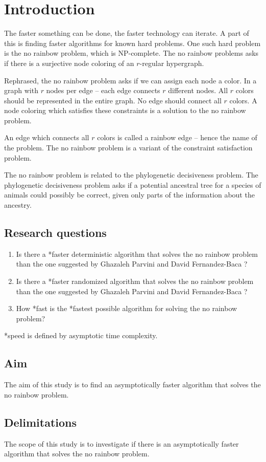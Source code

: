 \chapter{Introduction}
The faster something can be done, the faster technology can iterate.
A part of this is finding faster algorithms for known hard problems.
One such hard problem is the no rainbow problem, which is NP-complete.
The no rainbow problems asks if there is a surjective node coloring of an $r$-regular hypergraph.
\cite{sourceNoRainbow}

Rephrased, the no rainbow problem asks if we can assign each node a color.
In a graph with $r$ nodes per edge -- each edge connects $r$ different nodes.
All $r$ colors should be represented in the entire graph.
No edge should connect all $r$ colors.
A node coloring which satisfies these constraints is a solution to the no rainbow problem.

An edge which connects all $r$ colors is called a rainbow edge -- hence the name of the problem.
The no rainbow problem is a variant of the constraint satisfaction problem.

The no rainbow problem is related to the phylogenetic decisiveness problem. The phylogenetic decisiveness problem asks if a potential ancestral tree for a species of animals could possibly be correct, given only parts of the information about the ancestry. \cite{sourcePhylogeneticDecisiveness}

\section{Research questions}
\begin{enumerate}
  \item Is there a *faster deterministic algorithm that solves the no rainbow problem than the one suggested by Ghazaleh Parvini and David Fernandez-Baca \cite{sourceNoRainbow}?
  \item Is there a *faster randomized algorithm that solves the no rainbow problem than the one suggested by Ghazaleh Parvini and David Fernandez-Baca \cite{sourceNoRainbow}?
  \item How *fast is the *fastest possible algorithm for solving the no rainbow problem? 
\end{enumerate}
*speed is defined by asymptotic time complexity.

\section{Aim}
The aim of this study is to find an asymptotically faster algorithm that solves
the no rainbow problem.

\section{Delimitations}
The scope of this study is to investigate if there is an asymptotically faster
algorithm that solves the no rainbow problem.

